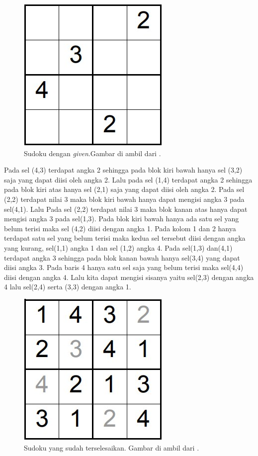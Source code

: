 \begin{figure}[H]
	\begin{centering}
		\includegraphics[scale=0.7]{gambar/4x4.jpeg}
		
		\caption{Sudoku dengan \textit{given}.Gambar di ambil dari \cite{SAT423}.}
	\end{centering}
\end{figure}

Pada sel (4,3) terdapat angka 2 sehingga pada blok kiri bawah hanya sel (3,2) saja yang dapat diisi oleh angka 2. Lalu pada sel (1,4) terdapat angka 2 sehingga pada blok kiri atas hanya sel (2,1) saja yang dapat diisi oleh angka 2. Pada sel (2,2) terdapat nilai 3 maka blok kiri bawah hanya dapat mengisi angka 3 pada sel(4,1). Lalu Pada sel (2,2) terdapat nilai 3 maka blok kanan atas hanya dapat mengisi angka 3 pada sel(1,3). Pada blok kiri bawah hanya ada satu sel yang belum terisi maka sel (4,2) diisi dengan angka 1. Pada kolom 1 dan 2 hanya terdapat satu sel yang belum terisi maka kedua sel tersebut diisi dengan angka yang kurang, sel(1,1) angka 1 dan sel (1,2) angka 4. Pada sel(1,3) dan(4,1) terdapat angka 3 sehingga pada blok kanan bawah hanya sel(3,4) yang dapat diisi angka 3. Pada baris 4 hanya satu sel saja yang belum terisi maka sel(4,4) diisi dengan angka 4. Lalu kita dapat mengisi sisanya yaitu sel(2,3) dengan angka 4 lalu sel(2,4) serta (3,3) dengan angka 1.

\begin{figure}[H]
	\begin{centering}
		\includegraphics[scale=0.7]{gambar/4x4solved.jpeg}
		
		\caption{Sudoku yang sudah terselesaikan. Gambar di ambil dari \cite{SAT423}.}
	\end{centering}
\end{figure}

